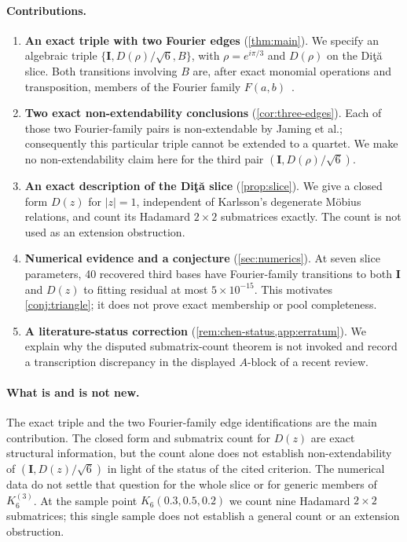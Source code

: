 \documentclass[11pt]{article}
\numberwithin{equation}{section}
\theoremstyle{plain}
\theoremstyle{definition}
\theoremstyle{remark}
\newcommand{\I}{\mathbf{I}}
\newcommand{\Dita}{\texorpdfstring{Di\c{t}\u{a}}{Dita}}
\begin{document}
\paragraph{Contributions.}
\begin{enumerate}
\item \textbf{An exact triple with two Fourier edges} (\cref{thm:main}). We specify an algebraic triple $\{\I,D(\rho)/\sqrt6,B\}$, with $\rho=e^{i\pi/3}$ and $D(\rho)$ on the \Dita{} slice. Both transitions involving $B$ are, after exact monomial operations and transposition, members of the Fourier family $F(a,b)$~\cite{Jaming2009}.
\item \textbf{Two exact non-extendability conclusions} (\cref{cor:three-edges}). Each of those two Fourier-family pairs is non-extendable by Jaming et al.; consequently this particular triple cannot be extended to a quartet. We make no non-extendability claim here for the third pair $(\I,D(\rho)/\sqrt6)$.
\item \textbf{An exact description of the \Dita{} slice} (\cref{prop:slice}). We give a closed form $D(z)$ for $|z|=1$, independent of Karlsson's degenerate M\"obius relations, and count its Hadamard $2\times2$ submatrices exactly. The count is not used as an extension obstruction.
\item \textbf{Numerical evidence and a conjecture} (\cref{sec:numerics}). At seven slice parameters, 40 recovered third bases have Fourier-family transitions to both $\I$ and $D(z)$ to fitting residual at most $5\times10^{-15}$. This motivates \cref{conj:triangle}; it does not prove exact membership or pool completeness.
\item \textbf{A literature-status correction} (\cref{rem:chen-status,app:erratum}). We explain why the disputed submatrix-count theorem is not invoked and record a transcription discrepancy in the displayed $A$-block of a recent review.
\end{enumerate}

\paragraph{What is and is not new.} The exact triple and the two Fourier-family edge identifications are the main contribution. The closed form and submatrix count for $D(z)$ are exact structural information, but the count alone does not establish non-extendability of $(\I,D(z)/\sqrt6)$ in light of the status of the cited criterion. The numerical data do not settle that question for the whole slice or for generic members of $K_6^{(3)}$. At the sample point $K_6(0.3,0.5,0.2)$ we count nine Hadamard $2\times2$ submatrices; this single sample does not establish a general count or an extension obstruction.
\end{document}
